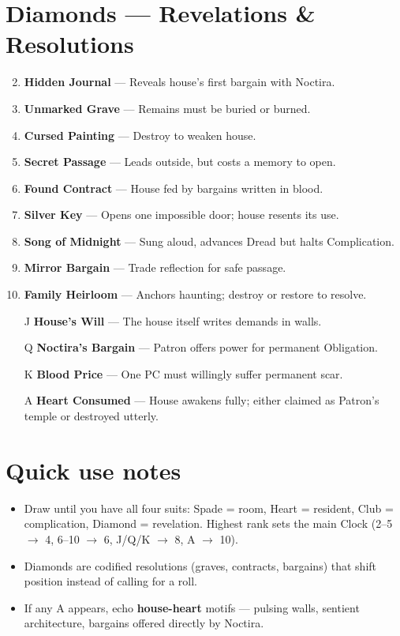 \documentclass[11pt]{article}
\begin{document}
\section*{Diamonds --- Revelations \& Resolutions}
\label{sec:haunted-house-revelations}
\begin{enumerate}
\setcounter{enumi}{1}
\item \textbf{Hidden Journal} --- Reveals house’s first bargain with Noctira.
\item \textbf{Unmarked Grave} --- Remains must be buried or burned.
\item \textbf{Cursed Painting} --- Destroy to weaken house.
\item \textbf{Secret Passage} --- Leads outside, but costs a memory to open.
\item \textbf{Found Contract} --- House fed by bargains written in blood.
\item \textbf{Silver Key} --- Opens one impossible door; house resents its use.
\item \textbf{Song of Midnight} --- Sung aloud, advances Dread but halts Complication.
\item \textbf{Mirror Bargain} --- Trade reflection for safe passage.
\item \textbf{Family Heirloom} --- Anchors haunting; destroy or restore to resolve.
\item[J] \textbf{House’s Will} --- The house itself writes demands in walls.
\item[Q] \textbf{Noctira’s Bargain} --- Patron offers power for permanent Obligation.
\item[K] \textbf{Blood Price} --- One PC must willingly suffer permanent scar.
\item[A] \textbf{Heart Consumed} --- House awakens fully; either claimed as Patron’s temple or destroyed utterly.
\end{enumerate}

\section*{Quick use notes}
\label{sec:haunted-house-quick}
\begin{itemize}
\item Draw until you have all four suits: Spade = room, Heart = resident, Club = complication, Diamond = revelation. Highest rank sets the main Clock (2--5 $\rightarrow$ 4, 6--10 $\rightarrow$ 6, J/Q/K $\rightarrow$ 8, A $\rightarrow$ 10).
\item Diamonds are codified resolutions (graves, contracts, bargains) that shift position instead of calling for a roll.
\item If any A appears, echo \textbf{house-heart} motifs --- pulsing walls, sentient architecture, bargains offered directly by Noctira.
\end{itemize}
\end{document}
